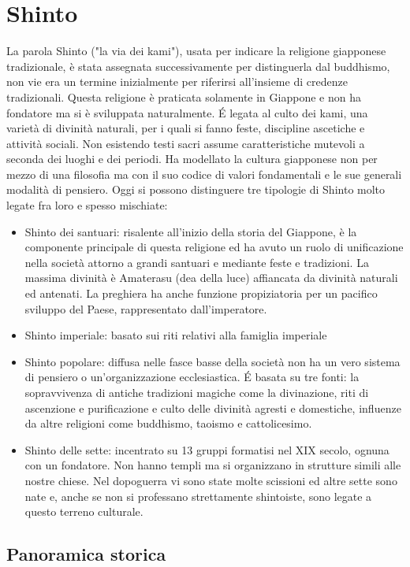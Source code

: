 \documentclass[10pt,a4paper]{report}
\begin{document}
\chapter{Shinto}
La parola Shinto ("la via dei kami"), usata per indicare la religione giapponese tradizionale, è stata assegnata successivamente per distinguerla dal buddhismo, non vie era un termine inizialmente per riferirsi all'insieme di credenze tradizionali. Questa religione è praticata solamente in Giappone e non ha fondatore ma si è sviluppata naturalmente. \'E legata al culto dei kami, una varietà di divinità naturali, per i quali si fanno feste, discipline ascetiche e attività sociali. Non esistendo testi sacri assume caratteristiche mutevoli a seconda dei luoghi e dei periodi. Ha modellato la cultura giapponese non per mezzo di una filosofia ma con il suo codice di valori fondamentali e le sue generali modalità di pensiero. Oggi si possono distinguere tre tipologie di Shinto molto legate fra loro e spesso mischiate:
\begin{itemize}
	\item Shinto dei santuari: risalente all'inizio della storia del Giappone, è la componente principale di questa religione ed ha avuto un ruolo di unificazione nella società attorno a grandi santuari e mediante feste e tradizioni. La massima divinità è Amaterasu (dea della luce) affiancata da divinità naturali ed antenati. La preghiera ha anche funzione propiziatoria per un pacifico sviluppo del Paese, rappresentato dall'imperatore.  
	\item Shinto imperiale: basato sui riti relativi alla famiglia imperiale
	\item Shinto popolare: diffusa nelle fasce basse della società non ha un vero sistema di pensiero o un'organizzazione ecclesiastica. \'E basata su tre fonti: la sopravvivenza di antiche tradizioni magiche come la divinazione, riti di ascenzione e purificazione e culto delle divinità agresti e domestiche, influenze da altre religioni come buddhismo, taoismo e cattolicesimo.  
	\item Shinto delle sette: incentrato su 13 gruppi formatisi nel XIX secolo, ognuna con un fondatore. Non hanno templi ma si organizzano in strutture simili alle nostre chiese. Nel dopoguerra vi sono state molte scissioni ed altre sette sono nate e, anche se non si professano strettamente shintoiste, sono legate a questo terreno culturale.
\end{itemize}
\section{Panoramica storica}
\end{document}
